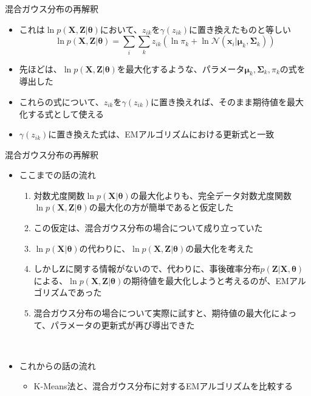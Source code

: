 \documentclass[dvipdfmx,notheorems,t]{beamer}
\begin{document}
\begin{frame}{混合ガウス分布の再解釈}
\begin{itemize}
\begin{itemize}
		\item これは$\ln p(\bm{X}, \bm{Z} | \bm{\theta})$において、$z_{ik}$を$\gamma(z_{ik})$に置き換えたものと等しい
		\begin{equation}
			\ln p(\bm{X}, \bm{Z} | \bm{\theta}) = \sum_i \sum_k z_{ik} \left( \ln \pi_k + \ln \mathcal{N}(\bm{x}_i | \bm{\mu}_k, \bm{\Sigma}_k) \right)
		\end{equation}
		
		\item 先ほどは、$\ln p(\bm{X}, \bm{Z} | \bm{\theta})$を最大化するような、パラメータ$\bm{\mu}_k, \bm{\Sigma}_k, \pi_k$の式を導出した
		\item これらの式について、$z_{ik}$を$\gamma(z_{ik})$に置き換えれば、そのまま期待値を最大化する式として使える
		\newline
		\item $\gamma(z_{ik})$に置き換えた式は、\alert{EMアルゴリズムにおける更新式と一致}
	\end{itemize}
\end{itemize}

\end{frame}

\begin{frame}{混合ガウス分布の再解釈}

\begin{itemize}
	\item ここまでの話の流れ
	\begin{enumerate}
		\item 対数尤度関数$\ln p(\bm{X} | \bm{\theta})$の最大化よりも、完全データ対数尤度関数$\ln p(\bm{X}, \bm{Z} | \bm{\theta})$の最大化の方が簡単であると仮定した
		\newline
		\item この仮定は、混合ガウス分布の場合について成り立っていた
		\newline
		\item $\ln p(\bm{X} | \bm{\theta})$の代わりに、$\ln p(\bm{X}, \bm{Z} | \bm{\theta})$の最大化を考えた
		\newline
		\item しかし$\bm{Z}$に関する情報がないので、代わりに、事後確率分布$p(\bm{Z} | \bm{X}, \bm{\theta})$による、$\ln p(\bm{X}, \bm{Z} | \bm{\theta})$の\alert{期待値を最大化}しようと考えるのが、EMアルゴリズムであった
		\newline
		\item 混合ガウス分布の場合について実際に試すと、期待値の最大化によって、パラメータの更新式が再び導出できた
	\end{enumerate} \
	
	\framebreak
	
	\item これからの話の流れ
	\begin{itemize}
		\item K-Means法と、混合ガウス分布に対するEMアルゴリズムを比較する
	\end{itemize}
\end{itemize}

\end{frame}
\end{document}
